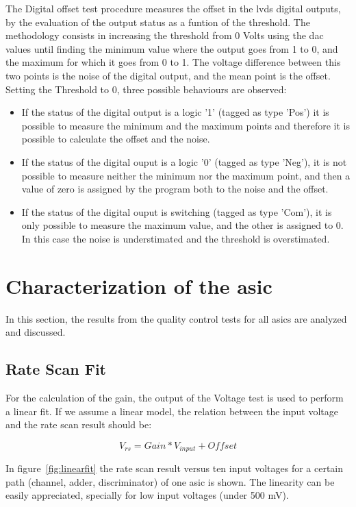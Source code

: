 \documentclass[main.tex]{subfiles}
\begin{document}
The Digital offset test procedure measures the offset in the \gls{lvds} digital outputs, by the evaluation of the output status as a funtion of the threshold. The methodology consists in increasing the threshold from 0 Volts using the \gls{dac} values until finding the minimum value where the output goes from 1 to 0, and the maximum for which it goes from 0 to 1. The voltage difference between this two points is the noise of the digital output, and the mean point is the offset. Setting the Threshold to 0, three possible behaviours are observed:
\begin{itemize}
\item If the status of the digital output is a logic '1' (tagged as type 'Pos') it is possible to measure the minimum and the maximum points and therefore it is possible to calculate the offset and the noise.
\item If the status of the digital ouput is a logic '0' (tagged as type 'Neg'), it is not possible to measure neither the minimum nor the maximum point, and then a value of zero is assigned by the program both to the noise and the offset.
\item If the status of the digital ouput is switching (tagged as type 'Com'), it is only possible to measure the maximum value, and the other is assigned to 0. In this case the noise is understimated and the threshold is overstimated.
\end{itemize}

\section{Characterization of the \gls{asic}}

In this section, the results from the quality control tests for all \glspl{asic} are analyzed and discussed.

\subsection{Rate Scan Fit}

For the calculation of the gain, the output of the Voltage test is used to perform a linear fit. If we assume a linear model, the relation between the input voltage and the rate scan result should be:

\begin{equation}
  \label{eq:fit}
  V_{rs} = Gain*V_{input} + Offset
\end{equation}

In figure~\ref{fig:linearfit} the rate scan result versus ten input voltages for a certain path (channel, adder, discriminator) of one \gls{asic} is shown. The linearity can be easily appreciated, specially for low input voltages (under 500 mV).
\end{document}
